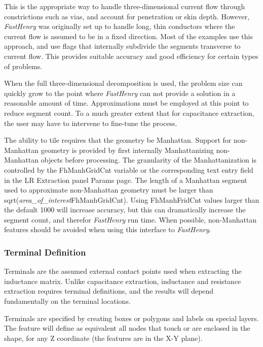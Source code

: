 This is the appropriate way to handle three-dimensional current flow
through constrictions such as vias, and account for penetration or
skin depth.  However, {\it FastHenry} was originally set up to handle
long, thin conductors where the current flow is assumed to be in a
fixed direction.  Most of the examples use this approach, and use
flags that internally subdivide the segments transverse to current
flow.  This provides suitable accuracy and good efficiency for certain
types of problems.

When the full three-dimensional decomposition is used, the problem
size can quickly grow to the point where {\it FastHenry} can not
provide a solution in a reasonable amount of time.  Approximations
must be employed at this point to reduce segment count.  To a much
greater extent that for capacitance extraction, the user may have to
intervene to fine-tune the process.

The ability to tile requires that the geometry be Manhattan.  Support
for non-Manhattan geometry is provided by first internally
Manhattanizing non-Manhattan objects before processing.  The
granularity of the Manhattanization is controlled by the {\et
FhManhGridCnt} variable or the corresponding text entry field in the
{\cb LR Extraction} panel {\cb Params} page.  The length of a
Manhattan segment used to approximate non-Manhattan geometry must be
larger than {\vt sqrt(}{\it area\_of\_interest\/}{\vt FhManhGridCnt)}. 
Using {\et FhManhFridCnt} values larger than the default 1000 will
increase accuracy, but this can dramatically increase the segment
count, and therefor {\it FastHenry} run time.  When possible,
non-Manhattan features should be avoided when using this interface to
{\it FastHenry}.

\subsubsection{Terminal Definition}

Terminals are the assumed external contact points used when extracting
the inductance matrix.  Unlike capacitance extraction, inductance and
resistance extraction requires terminal definitions, and the results
will depend fundamentally on the terminal locations.

Terminals are specified by creating boxes or polygons and labels on
special layers.  The feature will define as equivalent all nodes that
touch or are enclosed in the shape, for any Z coordinate (the features
are in the X-Y plane).

